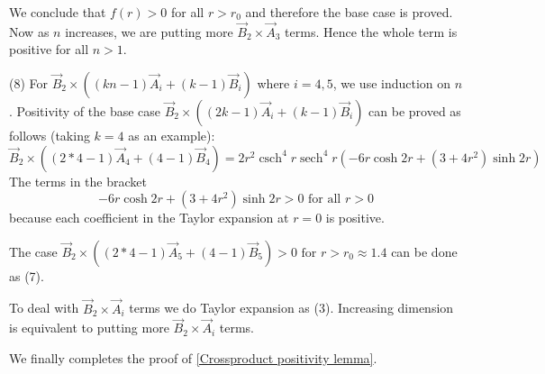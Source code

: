 \documentclass{amsart}
\numberwithin{equation}{section}
\theoremstyle{plain}
\theoremstyle{definition}
\theoremstyle{remark}
\DeclareMathOperator{\sech}{sech}
\DeclareMathOperator{\csch}{csch}
\begin{document}
 We conclude that $f(r)>0$ for all $r>r_0$ and therefore the base case is proved. Now as $n$ increases, we are putting more $\vec B_2 \times \vec A_3$ terms. Hence the whole term is positive for all $n>1$.
\par (8) For $\vec B_2 \times ((kn-1)\vec A_i+(k-1)\vec B_i)$ where $i=4,5$, we use induction on $n$. Positivity of the base case $\vec B_2 \times ((2k-1)\vec A_i+(k-1)\vec B_i)$ can be proved as follows (taking $k=4$ as an example):
\[\vec B_2 \times ((2*4-1)\vec A_4+(4-1)\vec B_4)=2 r^2 \csch^4 {r} \sech^4r(-6r\cosh{2r}+(3+4r^2)\sinh{2r})\]
The terms in the bracket 
\[-6r\cosh{2r}+(3+4r^2)\sinh{2r}>0 \text{ for all } r>0\] because each coefficient in the Taylor expansion at $r=0$ is positive.
\par The case $\vec B_2 \times ((2*4-1)\vec A_5+(4-1)\vec B_5)>0 \text{ for } r>r_0 \approx 1.4$ can be done as (7). 
\par To deal with $\vec B_2 \times \vec A_i$ terms we do Taylor expansion as (3). Increasing dimension is equivalent to putting more $\vec B_2 \times \vec A_i$ terms.
 
\par We finally completes the proof of \cref{Crossproduct positivity lemma}.







\printbibliography
\end{document}
